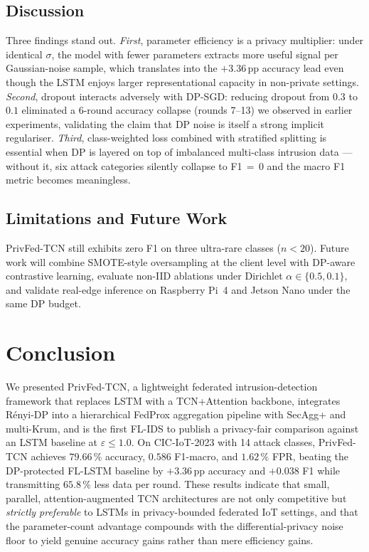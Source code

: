 \documentclass[conference]{IEEEtran}
\newcommand{\eps}{\varepsilon}
\begin{document}
\subsection{Discussion}
Three findings stand out.
\textit{First}, parameter efficiency is a privacy multiplier: under
identical $\sigma$, the model with fewer parameters extracts more
useful signal per Gaussian-noise sample, which translates into the
$+3.36$\,pp accuracy lead even though the LSTM enjoys larger
representational capacity in non-private settings.
\textit{Second}, dropout interacts adversely with DP-SGD: reducing
dropout from $0.3$ to $0.1$ eliminated a 6-round accuracy collapse
(rounds 7--13) we observed in earlier experiments, validating the
claim that DP noise is itself a strong implicit regulariser.
\textit{Third}, class-weighted loss combined with stratified splitting
is essential when DP is layered on top of imbalanced multi-class
intrusion data --- without it, six attack categories silently collapse
to F1\,$=$\,0 and the macro F1 metric becomes meaningless.

\subsection{Limitations and Future Work}
PrivFed-TCN still exhibits zero F1 on three ultra-rare classes
($n{<}20$). Future work will combine SMOTE-style oversampling at the
client level with DP-aware contrastive learning, evaluate non-IID
ablations under Dirichlet $\alpha\in\{0.5,0.1\}$, and validate
real-edge inference on Raspberry Pi~4 and Jetson Nano under the same
DP budget.

\section{Conclusion}\label{sec:conclusion}
We presented PrivFed-TCN, a lightweight federated intrusion-detection
framework that replaces LSTM with a TCN+Attention backbone, integrates
R\'enyi-DP into a hierarchical FedProx aggregation pipeline with
SecAgg+ and multi-Krum, and is the first FL-IDS to publish a
privacy-fair comparison against an LSTM baseline at $\eps\le 1.0$.
On CIC-IoT-2023 with 14 attack classes, PrivFed-TCN achieves
$79.66\,\%$ accuracy, $0.586$ F1-macro, and $1.62\,\%$ FPR, beating
the DP-protected FL-LSTM baseline by $+3.36$\,pp accuracy and
$+0.038$ F1 while transmitting $65.8\,\%$ less data per round. These
results indicate that small, parallel, attention-augmented TCN
architectures are not only competitive but \emph{strictly preferable}
to LSTMs in privacy-bounded federated IoT settings, and that the
parameter-count advantage compounds with the differential-privacy
noise floor to yield genuine accuracy gains rather than mere
efficiency gains.
\end{document}
